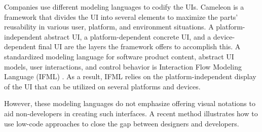 Companies use different modeling languages to codify the UIs.
Cameleon \cite{article:cameleon:balme} is a framework that divides the UI into several elements to maximize the parts' reusability in various user, platform, and environment situations.
A platform-independent abstract UI, a platform-dependent concrete UI, and a device-dependent final UI are the layers the framework offers to accomplish this.
A standardized modeling language for software product content, abstract UI models, user interactions, and control behavior is Interaction Flow Modeling Language (IFML) \cite{article:ifml:piero}.
As a result, IFML relies on the platform-independent display of the UI that can be utilized on several platforms and devices.

However, these modeling languages do not emphasize offering visual notations to aid non-developers in creating such interfaces. 
A recent method \cite{article:mbse:bexiga} illustrates how to use low-code approaches to close the gap between designers and developers.


